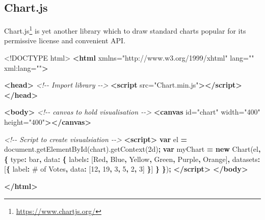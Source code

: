 \documentclass[
]{krantz}
\makeatletter
\newenvironment{Shaded}{\begin{snugshade}}{\end{snugshade}}
\newcommand{\AttributeTok}[1]{\textcolor[rgb]{0.61,0.61,0.61}{#1}}
\newcommand{\CommentTok}[1]{\textcolor[rgb]{0.37,0.37,0.37}{\textit{#1}}}
\newcommand{\DataTypeTok}[1]{\textcolor[rgb]{0.27,0.27,0.27}{#1}}
\newcommand{\DecValTok}[1]{\textcolor[rgb]{0.06,0.06,0.06}{#1}}
\newcommand{\KeywordTok}[1]{\textcolor[rgb]{0.27,0.27,0.27}{\textbf{#1}}}
\newcommand{\NormalTok}[1]{#1}
\newcommand{\OperatorTok}[1]{\textcolor[rgb]{0.43,0.43,0.43}{\textbf{#1}}}
\newcommand{\OtherTok}[1]{\textcolor[rgb]{0.37,0.37,0.37}{#1}}
\newcommand{\StringTok}[1]{\textcolor[rgb]{0.5,0.5,0.5}{#1}}
\newcommand{\VariableTok}[1]{\textcolor[rgb]{0,0,0}{#1}}
\renewcommand{\href}[2]{#2\footnote{\url{#1}}}
\newenvironment{kframe}{%
\medskip{}
\setlength{\fboxsep}{.8em}
 \def\at@end@of@kframe{}%
 \ifinner\ifhmode%
  \def\at@end@of@kframe{\end{minipage}}%
  \begin{minipage}{\columnwidth}%
 \fi\fi%
 \def\FrameCommand##1{\hskip\@totalleftmargin \hskip-\fboxsep
 \colorbox{shadecolor}{##1}\hskip-\fboxsep
     \hskip-\linewidth \hskip-\@totalleftmargin \hskip\columnwidth}%
 \MakeFramed {\advance\hsize-\width
   \@totalleftmargin\z@ \linewidth\hsize
   \@setminipage}}%
 {\par\unskip\endMakeFramed%
 \at@end@of@kframe}
\renewenvironment{Shaded}{\begin{kframe}}{\end{kframe}}
\makeatother
\begin{document}
\hypertarget{chart.js}{%
\subsection*{Chart.js}\label{chart.js}}


\href{https://www.chartjs.org/}{Chart.js} is yet another library which to draw standard charts popular for its permissive license and convenient API.

\begin{Shaded}
\begin{Highlighting}[]
\DataTypeTok{<!DOCTYPE }\NormalTok{html}\DataTypeTok{>}
\KeywordTok{<html}\OtherTok{ xmlns=}\StringTok{"http://www.w3.org/1999/xhtml"}\OtherTok{ lang=}\StringTok{""}\OtherTok{ xml:lang=}\StringTok{""}\KeywordTok{>}

\KeywordTok{<head>}
  \CommentTok{<!{-}{-} Import library {-}{-}>}
  \KeywordTok{<script}\OtherTok{ src=}\StringTok{"Chart.min.js"}\KeywordTok{></script>}
\KeywordTok{</head>}

\KeywordTok{<body>}
  \CommentTok{<!{-}{-} canvas to hold visualisation {-}{-}>}
  \KeywordTok{<canvas}\OtherTok{ id=}\StringTok{"chart"}\OtherTok{ width=}\StringTok{"400"}\OtherTok{ height=}\StringTok{"400"}\KeywordTok{></canvas>}

  \CommentTok{<!{-}{-} Script to create visualsiation {-}{-}>}
  \KeywordTok{<script>}
    \KeywordTok{var}\NormalTok{ el }\OperatorTok{=} \VariableTok{document}\NormalTok{.}\AttributeTok{getElementById}\NormalTok{(}\StringTok{\textquotesingle{}chart\textquotesingle{}}\NormalTok{).}\AttributeTok{getContext}\NormalTok{(}\StringTok{\textquotesingle{}2d\textquotesingle{}}\NormalTok{)}\OperatorTok{;}    
    \KeywordTok{var}\NormalTok{ myChart }\OperatorTok{=} \KeywordTok{new} \AttributeTok{Chart}\NormalTok{(el}\OperatorTok{,} \OperatorTok{\{}
      \DataTypeTok{type}\OperatorTok{:} \StringTok{\textquotesingle{}bar\textquotesingle{}}\OperatorTok{,}
      \DataTypeTok{data}\OperatorTok{:} \OperatorTok{\{}
        \DataTypeTok{labels}\OperatorTok{:}\NormalTok{ [}\StringTok{\textquotesingle{}Red\textquotesingle{}}\OperatorTok{,} \StringTok{\textquotesingle{}Blue\textquotesingle{}}\OperatorTok{,} \StringTok{\textquotesingle{}Yellow\textquotesingle{}}\OperatorTok{,} \StringTok{\textquotesingle{}Green\textquotesingle{}}\OperatorTok{,} \StringTok{\textquotesingle{}Purple\textquotesingle{}}\OperatorTok{,} \StringTok{\textquotesingle{}Orange\textquotesingle{}}\NormalTok{]}\OperatorTok{,}
        \DataTypeTok{datasets}\OperatorTok{:}\NormalTok{ [}\OperatorTok{\{}
          \DataTypeTok{label}\OperatorTok{:} \StringTok{\textquotesingle{}\# of Votes\textquotesingle{}}\OperatorTok{,}
          \DataTypeTok{data}\OperatorTok{:}\NormalTok{ [}\DecValTok{12}\OperatorTok{,} \DecValTok{19}\OperatorTok{,} \DecValTok{3}\OperatorTok{,} \DecValTok{5}\OperatorTok{,} \DecValTok{2}\OperatorTok{,} \DecValTok{3}\NormalTok{]}
        \OperatorTok{\}}\NormalTok{]}
      \OperatorTok{\}}
    \OperatorTok{\}}\NormalTok{)}\OperatorTok{;}
  \KeywordTok{</script>}
\KeywordTok{</body>}

\KeywordTok{</html>}
\end{Highlighting}
\end{Shaded}
\end{document}
